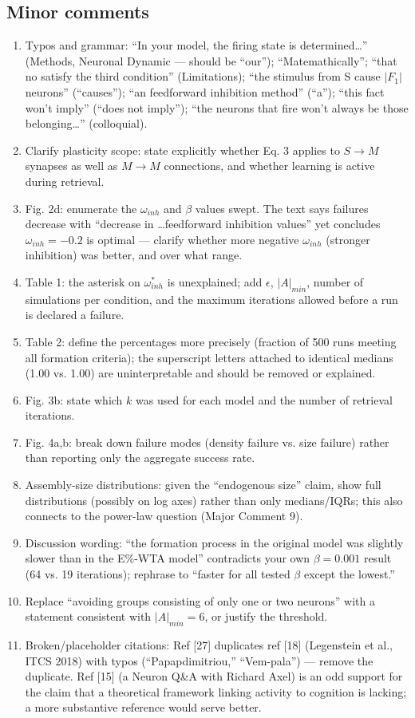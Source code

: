 \documentclass[a4paper, 11pt]{article}
\begin{document}
\subsection*{Minor comments}
\begin{enumerate}
    \item Typos and grammar: ``In your model, the firing state is determined\dots'' (Methods, Neuronal Dynamic — should be ``our''); ``Matemathically''; ``that no satisfy the third condition'' (Limitations); ``the stimulus from S cause $|F_1|$ neurons'' (``causes''); ``an feedforward inhibition method'' (``a''); ``this fact won't imply'' (``does not imply''); ``the neurons that fire won't always be those belonging\dots'' (colloquial).
    \item Clarify plasticity scope: state explicitly whether Eq. 3 applies to $S \rightarrow M$ synapses as well as $M \rightarrow M$ connections, and whether learning is active during retrieval.
    \item Fig. 2d: enumerate the $\omega_{inh}$ and $\beta$ values swept. The text says failures decrease with ``decrease in \dots feedforward inhibition values'' yet concludes $\omega_{inh} = -0.2$ is optimal — clarify whether more negative $\omega_{inh}$ (stronger inhibition) was better, and over what range.
    \item Table 1: the asterisk on $\omega_{inh}^*$ is unexplained; add $\epsilon$, $|A|_{min}$, number of simulations per condition, and the maximum iterations allowed before a run is declared a failure.
    \item Table 2: define the percentages more precisely (fraction of 500 runs meeting all formation criteria); the superscript letters attached to identical medians (1.00 vs. 1.00) are uninterpretable and should be removed or explained.
    \item Fig. 3b: state which $k$ was used for each model and the number of retrieval iterations.
    \item Fig. 4a,b: break down failure modes (density failure vs. size failure) rather than reporting only the aggregate success rate.
    \item Assembly-size distributions: given the ``endogenous size'' claim, show full distributions (possibly on log axes) rather than only medians/IQRs; this also connects to the power-law question (Major Comment 9).
    \item Discussion wording: ``the formation process in the original model was slightly slower than in the E\%-WTA model'' contradicts your own $\beta = 0.001$ result (64 vs. 19 iterations); rephrase to ``faster for all tested $\beta$ except the lowest.''
    \item Replace ``avoiding groups consisting of only one or two neurons'' with a statement consistent with $|A|_{min} = 6$, or justify the threshold.
    \item Broken/placeholder citations: Ref [27] duplicates ref [18] (Legenstein et al., ITCS 2018) with typos (``Papapdimitriou,'' ``Vem-pala'') — remove the duplicate. Ref [15] (a Neuron Q\&A with Richard Axel) is an odd support for the claim that a theoretical framework linking activity to cognition is lacking; a more substantive reference would serve better.
\end{enumerate}
\end{document}

